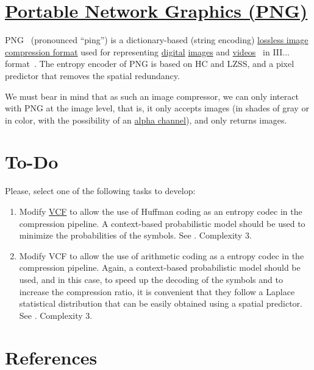 \section{\href{https://en.wikipedia.org/wiki/Portable_Network_Graphics}{Portable Network Graphics (PNG)}}
PNG~\cite{vruiz__PNG} (pronounced ``ping'') is a dictionary-based
(string encoding)
\href{https://en.wikipedia.org/wiki/Lossless_compression}{lossless
  image compression format} used for representing
\href{https://en.wikipedia.org/wiki/Digital_data}{digital}
\href{https://en.wikipedia.org/wiki/Digital_image}{images} and
\href{https://en.wikipedia.org/wiki/Video}{videos}~\cite{vruiz__image_video}
in III... format~\cite{vruiz__video_compression}. The entropy encoder
of PNG is based on HC and LZSS, and a pixel predictor that removes the
spatial redundancy.

We must bear in mind that as such an image compressor, we can only
interact with PNG at the image level, that is, it only accepts images
(in shades of gray or in color, with the possibility of an
\href{https://en.wikipedia.org/wiki/Alpha_compositing}{alpha channel}),
and only returns images.



\section{To-Do}
Please, select one of the following tasks to develop:
\begin{enumerate}
\item Modify \href{https://github.com/Sistemas-Multimedia/VCF}{VCF} to
  allow the use of Huffman coding as an entropy codec in the
  compression pipeline. A context-based probabilistic model should be
  used to minimize the probabilities of the symbols. See
  \cite{nelson96datacompression}. Complexity 3.
\item Modify VCF to allow the use of arithmetic coding as a entropy
  codec in the compression pipeline. Again, a context-based
  probabilistic model should be used, and in this case, to speed up
  the decoding of the symbols and to increase the compression ratio,
  it is convenient that they follow a Laplace statistical distribution
  that can be easily obtained using a spatial predictor. See
  \cite{nelson96datacompression}. Complexity 3.
\end{enumerate}

\section{References}

\renewcommand{\addcontentsline}[3]{}%

